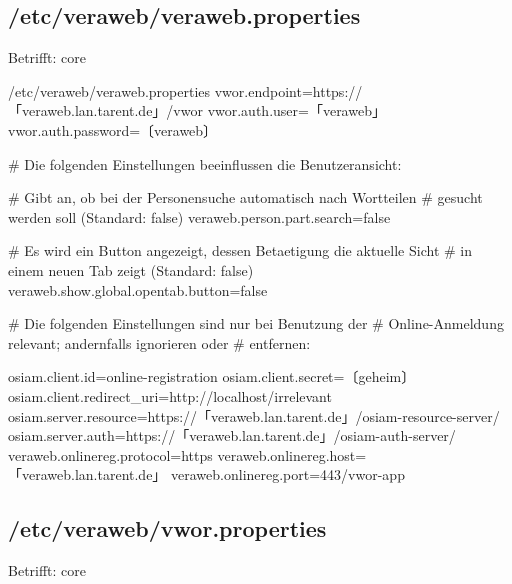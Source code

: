 \documentclass{tarentanleitung}
\begin{document}
\subsection{/etc/veraweb/veraweb.properties}\label{subsec:refcfg-vw-vwprop}

Betrifft: core

\begin{lstdump}{/etc/veraweb/veraweb.properties}
vwor.endpoint=https://「veraweb.lan.tarent.de」/vwor
vwor.auth.user=「veraweb」
vwor.auth.password=〔veraweb〕

# Die folgenden Einstellungen beeinflussen die Benutzeransicht:

# Gibt an, ob bei der Personensuche automatisch nach Wortteilen
# gesucht werden soll (Standard: false)
veraweb.person.part.search=false

# Es wird ein Button angezeigt, dessen Betaetigung die aktuelle Sicht
# in einem neuen Tab zeigt (Standard: false)
veraweb.show.global.opentab.button=false

# Die folgenden Einstellungen sind nur bei Benutzung der
# Online-Anmeldung relevant; andernfalls ignorieren oder
# entfernen:

osiam.client.id=online-registration
osiam.client.secret=〔geheim〕
osiam.client.redirect_uri=http://localhost/irrelevant
osiam.server.resource=https://「veraweb.lan.tarent.de」/osiam-resource-server/
osiam.server.auth=https://「veraweb.lan.tarent.de」/osiam-auth-server/
veraweb.onlinereg.protocol=https
veraweb.onlinereg.host=「veraweb.lan.tarent.de」
veraweb.onlinereg.port=443/vwor-app
\end{lstdump}

\subsection{/etc/veraweb/vwor.properties}\label{subsec:refcfg-vw-vworprop}

Betrifft: core
\end{document}

